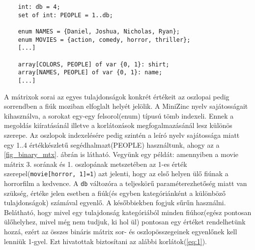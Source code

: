 \documentclass[12pt,a4paper,twoside, openright]{report}
\begin{document}
    
    \begin{lstlisting}
    int: db = 4;
    set of int: PEOPLE = 1..db;
    
    enum NAMES = {Daniel, Joshua, Nicholas, Ryan};
    enum MOVIES = {action, comedy, horror, thriller};
    [...]
    
    array[COLORS, PEOPLE] of var {0, 1}: shirt;
    array[NAMES, PEOPLE] of var {0, 1}: name;
    [...]\end{lstlisting}

    A mátrixok sorai az egyes tulajdonságok konkrét értékeit az oszlopai pedig sorrendben a fiúk moziban elfoglalt helyét jelölik.
    A MiniZinc nyelv sajátosságait kihasználva, a sorokat egy-egy felsorol(enum) típusú tömb indexeli.
    Ennek a megoldás kiíratásánál illetve a korlátozások megfogalmazásánál lesz különös szerepe.
    Az oszlopok indexelésére pedig szintén a leíró nyelv sajátossága miatt egy {1..4} értékkészletű segédhalmazt(PEOPLE) használtunk, ahogy az a \ref{fig_binary_mtx}. ábrán is látható.
    Vegyünk egy példát: amennyiben a movie mátrix 3. sorának és 1. oszlopának metszetében az 1-es érték szerepel(\texttt{movie[horror, 1]=1}) azt jelenti, hogy az első helyen ülő fiúnak a horrorfilm a kedvence.
    A \texttt{db} változóra a teljeskörű paraméterezhetőség miatt van szükség, értéke jelen esetben a fiúk(és egyben kategóriánként a különböző tulajdonságok) számával egyenlő. A későbbiekben fogjuk sűrűn használni.
    Belátható, hogy mivel egy tulajdonság kategóriából minden fiúhoz(egész pontosan ülőhelyhez, mivel még nem tudjuk, ki hol ül) pontosan egy értéket rendelhetünk hozzá, ezért az összes bináris mátrix sor- és oszlopösszegeinek egyenlőnek kell lenniük 1-gyel.
    Ezt hivatottak biztosítani az alábbi korlátok(\ref{eq:1}).
\end{document}
